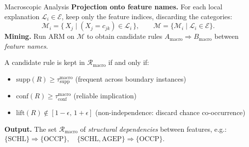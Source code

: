 \documentclass[10pt,aspectratio=169]{beamer}
\begin{document}
\begin{frame}{Macroscopic Analysis}
  \textbf{Projection onto feature names.} For each local explanation $\mathcal{L}_i \in \mathcal{E}$, keep only the feature indices, discarding the categories:
  \begin{equation*}
    \mathcal{M}_i = \{\, X_j \mid (X_j = c_{jk}) \in \mathcal{L}_i \,\}, 
    \qquad \mathcal{M} = \{\mathcal{M}_i \mid \mathcal{L}_i \in \mathcal{E}\}.
  \end{equation*}
  \textbf{Mining.} Run ARM on $\mathcal{M}$ to obtain candidate rules $A_{\mathrm{macro}} \Rightarrow B_{\mathrm{macro}}$ between \emph{feature names}.
  \vspace{4pt}
  
  \begin{tcolorbox}[colback=parthenopeaccent!25,colframe=parthenopenavy,boxrule=0.5pt,arc=1pt,title=\bfseries Filtering thresholds (macroscopic)]
    \small
    A candidate rule is kept in $\mathcal{R}_{\mathrm{macro}}$ if and only if:
    \begin{itemize}\small
      \item $\mathrm{supp}(R) \geq \tau_{\mathrm{supp}}^{\mathrm{macro}}$ \quad (frequent across boundary instances)
      \item $\mathrm{conf}(R) \geq \tau_{\mathrm{conf}}^{\mathrm{macro}}$ \quad (reliable implication)
      \item $\mathrm{lift}(R) \notin [1 - \epsilon,\, 1 + \epsilon]$ \quad (non-independence: discard chance co-occurrence)
    \end{itemize}
  \end{tcolorbox}
  \vspace{2pt}
  \textbf{Output.} The set $\mathcal{R}_{\mathrm{macro}}$ of \emph{structural dependencies} between features, e.g.:\\
  \quad $\{\mathrm{SCHL}\} \Rightarrow \{\mathrm{OCCP}\}, \quad \{\mathrm{SCHL}, \mathrm{AGEP}\} \Rightarrow \{\mathrm{OCCP}\}$.
\end{frame}
\end{document}
